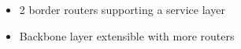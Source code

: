 \begin{itemize}
    \item 2 border routers supporting a service layer
    \item Backbone layer extensible with more routers
\end{itemize}
